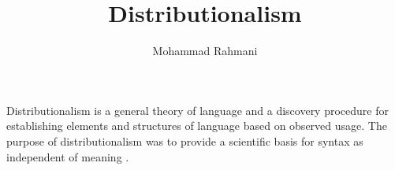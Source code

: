 \documentclass[a4paper]{article}
\title{Distributionalism}
\date{}
\author{Mohammad Rahmani}
\begin{document}
\maketitle
    Distributionalism is a general theory of language and a discovery procedure for establishing elements and structures of language based on observed usage. The purpose of distributionalism was to provide a scientific basis for syntax as independent of meaning .
    
    
\end{document}
